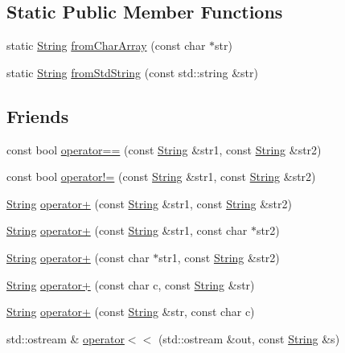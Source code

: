 \subsection*{Static Public Member Functions}
\begin{DoxyCompactItemize}
\item 
static \hyperlink{classprism_1_1_string}{String} \hyperlink{classprism_1_1_string_a11d319bfb0bf70ffdf71d2fc65b963db}{from\+Char\+Array} (const char $\ast$str)
\item 
static \hyperlink{classprism_1_1_string}{String} \hyperlink{classprism_1_1_string_a8692b9a7e4c25f349bb83b53ff3d6f36}{from\+Std\+String} (const std\+::string \&str)
\end{DoxyCompactItemize}
\subsection*{Friends}
\begin{DoxyCompactItemize}
\item 
const bool \hyperlink{classprism_1_1_string_a42ce36244ff044035bee8e0e1d764aa1}{operator==} (const \hyperlink{classprism_1_1_string}{String} \&str1, const \hyperlink{classprism_1_1_string}{String} \&str2)
\item 
const bool \hyperlink{classprism_1_1_string_a5ae2214b74e00980046a6b8bc25c5e7b}{operator!=} (const \hyperlink{classprism_1_1_string}{String} \&str1, const \hyperlink{classprism_1_1_string}{String} \&str2)
\item 
\hyperlink{classprism_1_1_string}{String} \hyperlink{classprism_1_1_string_a3ea798e6b83ba7c64271b5124e5120fc}{operator+} (const \hyperlink{classprism_1_1_string}{String} \&str1, const \hyperlink{classprism_1_1_string}{String} \&str2)
\item 
\hyperlink{classprism_1_1_string}{String} \hyperlink{classprism_1_1_string_a89cb74b26f923798ee7f796af2a1ae42}{operator+} (const \hyperlink{classprism_1_1_string}{String} \&str1, const char $\ast$str2)
\item 
\hyperlink{classprism_1_1_string}{String} \hyperlink{classprism_1_1_string_ab79aff2a74a10fab48972bc689e5d87d}{operator+} (const char $\ast$str1, const \hyperlink{classprism_1_1_string}{String} \&str2)
\item 
\hyperlink{classprism_1_1_string}{String} \hyperlink{classprism_1_1_string_a9df3169a19201b969014c154ef4b87a1}{operator+} (const char c, const \hyperlink{classprism_1_1_string}{String} \&str)
\item 
\hyperlink{classprism_1_1_string}{String} \hyperlink{classprism_1_1_string_a990ec91916a269128a8d9ad66b0224a9}{operator+} (const \hyperlink{classprism_1_1_string}{String} \&str, const char c)
\item 
std\+::ostream \& \hyperlink{classprism_1_1_string_a22f0a77d546199afaac3503fc9b9ef51}{operator$<$$<$} (std\+::ostream \&out, const \hyperlink{classprism_1_1_string}{String} \&s)
\end{DoxyCompactItemize}


